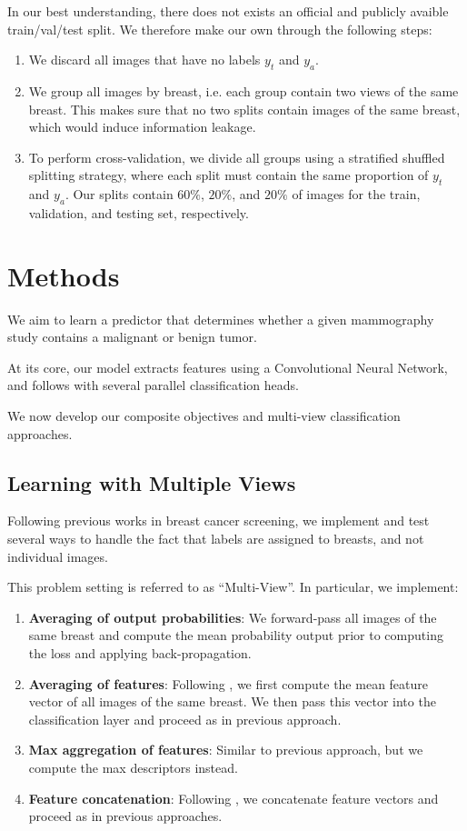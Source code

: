 \documentclass[11pt]{article}
\begin{document}
In our best understanding, there does not exists an official and publicly avaible train/val/test
split. We therefore make our own through the following steps:

\begin{enumerate}
\item We discard all images that have no labels \(y_t\) and \(y_a\).
\item We group all images by breast, i.e. each group contain two views of the same breast.
This makes sure that no two splits contain images of the same breast, which would
induce information leakage.
\item To perform cross-validation, we divide all groups using a stratified
shuffled splitting strategy, where each split
must contain the same proportion of \(y_t\) and \(y_a\). Our splits contain \(60\%\),
 \(20\%\), and \(20\%\) of images for the train, validation, and testing set, respectively.
\end{enumerate}

\section{Methods}
\label{sec:org0a553cc}

We aim to learn a predictor that determines whether a given mammography study
contains a malignant or benign tumor.

At its core, our model extracts features using a Convolutional Neural Network,
and follows with several parallel classification heads.

We now develop our composite objectives and multi-view classification approaches.

\subsection{\label{multiview}Learning with Multiple Views}
\label{sec:org3e12048}

Following previous works in breast cancer screening,
we implement and test several ways to handle the fact that
labels are assigned to breasts, and not individual images.

This problem setting is referred to as ``Multi-View''.
In particular, we implement:

\begin{enumerate}
\item \textbf{Averaging of output probabilities}:  We forward-pass all images of the same breast
and compute the mean probability output prior to computing the loss and applying
back-propagation.
\item \textbf{Averaging of features}: Following \autocite{geras17} \autocite{seeland21}, we first compute the mean feature vector of all images of the same
breast. We then pass this vector into the classification layer and proceed as in
previous approach.
\item \textbf{Max aggregation of features}: Similar to previous approach, but we compute the max descriptors instead.
\item \textbf{Feature concatenation}: Following \autocite{wu19} \autocite{chen22}, we concatenate feature
vectors and proceed as in previous approaches.
\end{enumerate}
\end{document}

